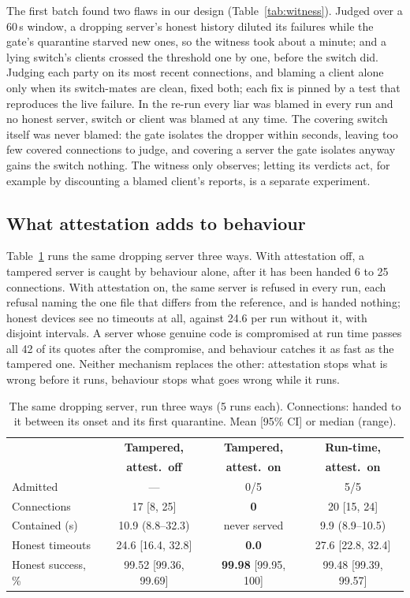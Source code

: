 \documentclass[10pt,twocolumn,letterpaper]{article}
\begin{document}
The first batch found two flaws in our design (Table~\ref{tab:witness}).
Judged over a 60\,s window, a dropping server's honest history diluted its
failures while the gate's quarantine starved new ones, so the witness took
about a minute; and a lying switch's clients crossed the threshold one by one,
before the switch did. Judging each party on its most recent connections, and
blaming a client alone only when its switch-mates are clean, fixed both; each
fix is pinned by a test that reproduces the live failure. In the re-run every
liar was blamed in every run and no honest server, switch or client was
blamed at any time. The covering switch itself was never blamed: the gate
isolates the dropper within seconds, leaving too few covered connections to
judge, and covering a server the gate isolates anyway gains the switch
nothing. The witness only observes; letting its verdicts act, for example by
discounting a blamed client's reports, is a separate experiment.

\subsection{What attestation adds to behaviour}
\label{sec:res:attest}
Table~\ref{tab:attest} runs the same dropping server three ways. With
attestation off, a tampered server is caught by behaviour alone, after it has
been handed 6 to 25 connections. With attestation on, the same server is
refused in every run, each refusal naming the one file that differs from the
reference, and is handed nothing; honest devices see no timeouts at all,
against 24.6 per run without it, with disjoint intervals. A server whose
genuine code is compromised at run time passes all 42 of its quotes after the
compromise, and behaviour catches it as fast as the tampered one. Neither
mechanism replaces the other: attestation stops what is wrong before it runs,
behaviour stops what goes wrong while it runs.

\begin{table}[t]
\caption{The same dropping server, run three ways (5 runs each). Connections:
  handed to it between its onset and its first quarantine. Mean [95\% CI]
  or median (range).}
\label{tab:attest}
\centering\scriptsize
\setlength{\tabcolsep}{2.5pt}
\begin{tabular}{@{}lccc@{}}
\toprule
 & \textbf{Tampered,} & \textbf{Tampered,} & \textbf{Run-time,}\\
 & \textbf{attest.\ off} & \textbf{attest.\ on} & \textbf{attest.\ on}\\
\midrule
Admitted & --- & 0/5 & 5/5\\
Connections & 17 [8, 25] & \textbf{0} & 20 [15, 24]\\
Contained (s) & 10.9 (8.8--32.3) & never served & 9.9 (8.9--10.5)\\
Honest timeouts & 24.6 [16.4, 32.8] & \textbf{0.0} & 27.6 [22.8, 32.4]\\
Honest success, \% & 99.52 [99.36, 99.69] & \textbf{99.98} [99.95, 100] & 99.48 [99.39, 99.57]\\
\bottomrule
\end{tabular}
\end{table}
\end{document}
